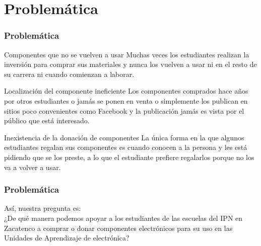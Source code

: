 \documentclass{beamer}
\begin{document}

\section{Problemática}

\begin{frame}
\frametitle{Problemática}
\begin{block}{Componentes que no se vuelven a usar}
Muchas veces los estudiantes realizan la inversión para comprar sus materiales y nunca los vuelven a usar ni en el resto de su carrera ni cuando comienzan a laborar.
\end{block}

\begin{block}{Localización del componente ineficiente}
Los componentes comprados hace años por otros estudiantes o jamás se ponen en venta o simplemente los publican en sitios poco convenientes como Facebook y la publicación jamás es vista por el público que está interesado.
\end{block}

\begin{block}{Inexistencia de la donación de componentes}
La única forma en la que algunos estudiantes regalan sus componentes es cuando conocen a la persona y les está pidiendo que se los preste, a lo que el estudiante prefiere regalarlos porque no los va a volver a usar.
\end{block}
\end{frame}

\begin{frame}
\frametitle{Problemática}
Así, nuestra pregunta es: \\

¿De qué manera podemos apoyar a los estudiantes de las escuelas del IPN en Zacatenco a comprar o donar componentes electrónicos para su uso en las Unidades de Aprendizaje de electrónica?
\end{frame}



\end{document}
